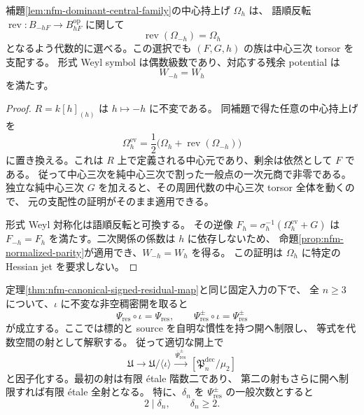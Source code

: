 \begin{lemma}[反転に両立する支配的中心族]
\label{lem:nfm-even-dominant-central-family}
補題\ref{lem:nfm-dominant-central-family}の中心持上げ $\Omega_h$ は、
語順反転 $\operatorname{rev}:B_{-hF}\to B_{hF}^{\mathrm{op}}$ に関して
\[
 \operatorname{rev}(\Omega_{-h})=\Omega_h
\]
となるよう代数的に選べる。この選択でも $(F,G,h)$ の族は中心三次 torsor を支配する。
形式 Weyl symbol は偶数級数であり、対応する残余 potential は
\[
 W_{-h}=W_h
\]
を満たす。
\end{lemma}

\begin{proof}
$R=k[h]_{(h)}$ は $h\mapsto-h$ に不変である。
同補題で得た任意の中心持上げを
\[
 \Omega_h^{\mathrm{ev}}
 =\frac12\bigl(\Omega_h+\operatorname{rev}(\Omega_{-h})\bigr)
\]
に置き換える。これは $R$ 上で定義される中心元であり、剰余は依然として $F$ である。
従って中心三次を純中心三次で割った一般点の一次元商で非零である。
独立な純中心三次 $G$ を加えると、その周囲代数の中心三次 torsor 全体を動くので、
元の支配性の証明がそのまま適用できる。

形式 Weyl 対称化は語順反転と可換する。
その逆像 $F_h=\sigma_h^{-1}(\Omega_h^{\mathrm{ev}}+G)$ は
$F_{-h}=F_h$ を満たす。二次関係の係数は $h$ に依存しないため、
命題\ref{prop:nfm-normalized-parity}が適用でき、$W_{-h}=W_h$ を得る。
この証明は $\Omega_h$ に特定の Hessian jet を要求しない。
\end{proof}

\begin{theorem}[残余射の反対不変性と偶数次数]
\label{thm:nfm-residual-opposite-even-degree}
定理\ref{thm:nfm-canonical-signed-residual-map}と同じ固定入力の下で、
全 $n\ge3$ について、$\iota$ に不変な非空稠密開を取ると
\[
 \Psi_{\mathrm{res}}\circ\iota=\Psi_{\mathrm{res}},\qquad
 \Psi_{\mathrm{res}}^\pm\circ\iota=\Psi_{\mathrm{res}}^\pm
\]
が成立する。ここでは標的と source を自明な慣性を持つ開へ制限し、
等式を代数空間の射として解釈する。
従って適切な開上で
\[
 \mathfrak U\longrightarrow\mathfrak U/\langle\iota\rangle
 \xrightarrow{\ \overline\Psi_{\mathrm{res}}^\pm\ }
 [\mathfrak P_n^{\mathrm{dec}}/\mu_2]
\]
と因子化する。最初の射は有限 \'etale 階数二であり、
第二の射もさらに開へ制限すれば有限 \'etale 全射となる。
特に、$\delta_n$ を $\Psi_{\mathrm{res}}^\pm$ の一般次数とすると
\[
 2\mid\delta_n,\qquad \delta_n\ge2.
\]
\end{theorem}

